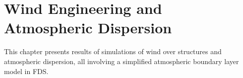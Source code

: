 
\chapter{Wind Engineering and Atmospheric Dispersion}

This chapter presents results of simulations of wind over structures and atmospheric dispersion, all involving a simplified atmospheric boundary layer model in FDS.

%
%



